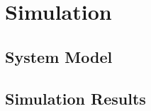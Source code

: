 \chapter[Simulation]{Simulation}
\label{chapter:Result}

\section{System Model}

\section{Simulation Results}
